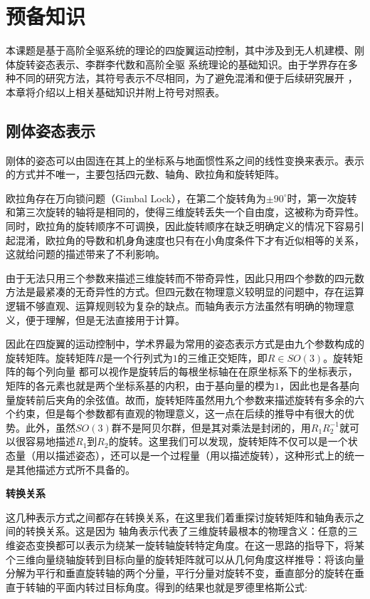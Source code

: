 
\chapter{预备知识}
  本课题是基于高阶全驱系统的理论的四旋翼运动控制，其中涉及到无人机建模、刚体旋转姿态表示、李群李代数和高阶全驱
  系统理论的基础知识。由于学界存在多种不同的研究方法，其符号表示不尽相同，为了避免混淆和便于后续研究展开 ，本章将介绍以上相关基础知识并附上符号对照表。
  \section{刚体姿态表示}
  刚体的姿态可以由固连在其上的坐标系与地面惯性系之间的线性变换来表示。表示的方式并不唯一，主要包括四元数、轴角、欧拉角和旋转矩阵\cite{attitude}。
  
  欧拉角存在万向锁问题（Gimbal Lock），在第二个旋转角为$\pm 90^{\circ}$时，第一次旋转和第三次旋转的轴将是相同的，使得三维旋转丢失一个自由度，这被称为奇异性。同时，欧拉角的旋转顺序不可调换，因此旋转顺序在缺乏明确定义的情况下容易引起混淆，欧拉角的导数和机身角速度也只有在小角度条件下才有近似相等的关系，这就给问题的描述带来了不利影响。
  
  由于无法只用三个参数来描述三维旋转而不带奇异性，因此只用四个参数的四元数方法是最紧凑的无奇异性的方式。但四元数在物理意义较明显的问题中，存在运算逻辑不够直观、运算规则较为复杂的缺点。而轴角表示方法虽然有明确的物理意义，便于理解，但是无法直接用于计算。

  因此在四旋翼的运动控制中，学术界最为常用的姿态表示方式是由九个参数构成的旋转矩阵。旋转矩阵$R$是一个行列式为$1$的三维正交矩阵，即$R\in SO(3)$。旋转矩阵的每个列向量  都可以视作是旋转后的每根坐标轴在在原坐标系下的坐标表示，矩阵的各元素也就是两个坐标系基的内积，由于基向量的模为$1$，因此也是各基向量旋转前后夹角的余弦值。故而，旋转矩阵虽然用九个参数来描述旋转有多余的六个约束，但是每个参数都有直观的物理意义，这一点在后续的推导中有很大的优势。此外，虽然$SO(3)$群不是阿贝尔群，但是其对乘法是封闭的，用$R_1R_2^{-1}$就可以很容易地描述$R_1$到$R_2$的旋转。这里我们可以发现，旋转矩阵不仅可以是一个状态量（用以描述姿态），还可以是一个过程量（用以描述旋转），这种形式上的统一是其他描述方式所不具备的。

  \textbf{转换关系}
  
  这几种表示方式之间都存在转换关系，在这里我们着重探讨旋转矩阵和轴角表示之间的转换关系。这是因为
  轴角表示代表了三维旋转最根本的物理含义：任意的三维姿态变换都可以表示为绕某一旋转轴旋转特定角度。在这一思路的指导下，将某个三维向量绕轴旋转到目标向量的旋转矩阵就可以从几何角度这样推导：将该向量分解为平行和垂直旋转轴的两个分量，平行分量对旋转不变，垂直部分的旋转在垂直于转轴的平面内转过目标角度。得到的结果也就是罗德里格斯公式\cite{Rodrigues1840}:

